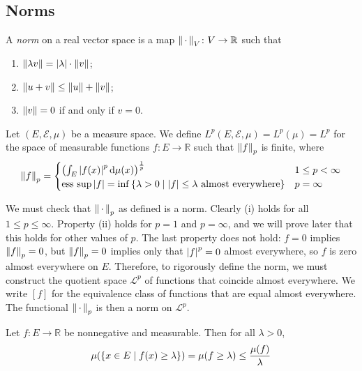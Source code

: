 \subsection{Norms}
\begin{definition}
	A \emph{norm} on a real vector space is a map \( \norm{\,\cdot\,}_V \colon V \to \mathbb R \) such that
	\begin{enumerate}
		\item \( \norm{\lambda v} = \abs{\lambda} \cdot \norm{v} \);
		\item \( \norm{u + v} \leq \norm{u} + \norm{v} \);
		\item \( \norm{v} = 0 \) if and only if \( v = 0 \).
	\end{enumerate}
\end{definition}
\begin{definition}
	Let \( (E, \mathcal E, \mu) \) be a measure space.
	We define \( L^p(E,\mathcal E,\mu) = L^p(\mu) = L^p \) for the space of measurable functions \( f \colon E \to \mathbb R \) such that \( \norm{f}_p \) is finite, where
	\[ \norm{f}_p = \begin{cases}
		\qty(\int_E \abs{f(x)}^p \dd{\mu(x)})^{\frac{1}{p}} & 1 \leq p < \infty \\
		\operatorname*{ess\ sup} \abs{f} = \inf \qty{\lambda > 0 \mid \abs{f} \leq \lambda \text{ almost everywhere}} & p = \infty
	\end{cases} \]
\end{definition}
We must check that \( \norm{\,\cdot\,}_p \) as defined is a norm.
Clearly (i) holds for all \( 1 \leq p \leq \infty \).
Property (ii) holds for \( p = 1 \) and \( p = \infty \), and we will prove later that this holds for other values of \( p \).
The last property does not hold: \( f = 0 \) implies \( \norm{f}_p = 0 \), but \( \norm{f}_p = 0 \) implies only that \( \abs{f}^p = 0 \) almost everywhere, so \( f \) is zero almost everywhere on \( E \).
Therefore, to rigorously define the norm, we must construct the quotient space \( \mathcal L^p \) of functions that coincide almost everywhere.
We write \( [f] \) for the equivalence class of functions that are equal almost everywhere.
The functional \( \norm{\,\cdot\,}_p \) is then a norm on \( \mathcal L^p \).
\begin{proposition}
	Let \( f \colon E \to \mathbb R \) be nonnegative and measurable.
	Then for all \( \lambda > 0 \),
	\[ \mu(\qty{x \in E \mid f(x) \geq \lambda}) = \mu(f \geq \lambda) \leq \frac{\mu(f)}{\lambda} \]
\end{proposition}
